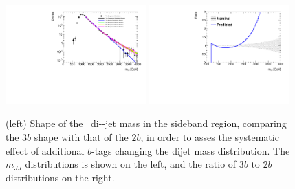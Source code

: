 \begin{figure}[htbp!]
\begin{center} 
\includegraphics[width=0.48\textwidth,angle=-90]{figures/boosted/Syst_Smooth/TopShapeSRSysfitSmooth_sig33_comp22.pdf}
\includegraphics[width=0.48\textwidth,angle=-90]{figures/boosted/Syst_Smooth/TopShapeSRSysfitSmooth_sig33_comp22_ratio.pdf}
\caption{(left)  Shape of the \ttbar\ di-\largeR-jet mass in the sideband region,
comparing the $3b$ shape with that of the $2b$, in order to asses the systematic effect of additional $b$-tags changing the dijet mass distribution.  The $m_{JJ}$ distributions is shown on the left, and the ratio of $3b$ to $2b$ distributions on the right.}
\label{fig:ttbar-shapes-signal}
\end{center}
\end{figure}

%

